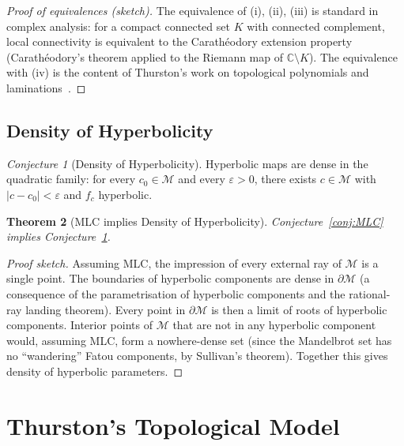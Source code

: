 \documentclass[12pt,a4paper]{amsart}
\newtheorem{theorem}{Theorem}[section]
\theoremstyle{definition}
\theoremstyle{remark}
\newtheorem{conjecture}[theorem]{Conjecture}
\begin{document}
\begin{proof}[Proof of equivalences (sketch)]
The equivalence of (i), (ii), (iii) is standard in complex analysis:
for a compact connected set $K$ with connected complement, local connectivity
is equivalent to the Carathéodory extension property
(Carathéodory's theorem applied to the Riemann map of $\mathbb{C} \setminus K$).
The equivalence with (iv) is the content of Thurston's work on
topological polynomials and laminations~\cite{Thurston1985}.
\end{proof}

\subsection{Density of Hyperbolicity}

\begin{conjecture}[Density of Hyperbolicity]
\label{conj:hyp-density}
Hyperbolic maps are dense in the quadratic family: for every
$c_0 \in \mathcal{M}$ and every $\varepsilon > 0$, there exists
$c \in \mathcal{M}$ with $|c - c_0| < \varepsilon$ and $f_c$ hyperbolic.
\end{conjecture}

\begin{theorem}[MLC implies Density of Hyperbolicity]
Conjecture~\ref{conj:MLC} implies Conjecture~\ref{conj:hyp-density}.
\end{theorem}

\begin{proof}[Proof sketch]
Assuming MLC, the impression of every external ray of $\mathcal{M}$ is a
single point. The boundaries of hyperbolic components are dense in
$\partial \mathcal{M}$ (a consequence of the parametrisation of
hyperbolic components and the rational-ray landing theorem). Every point
in $\partial \mathcal{M}$ is then a limit of roots of hyperbolic components.
Interior points of $\mathcal{M}$ that are not in any hyperbolic component
would, assuming MLC, form a nowhere-dense set (since the Mandelbrot set
has no ``wandering'' Fatou components, by Sullivan's theorem). Together
this gives density of hyperbolic parameters.
\end{proof}

\section{Thurston's Topological Model}
\end{document}
